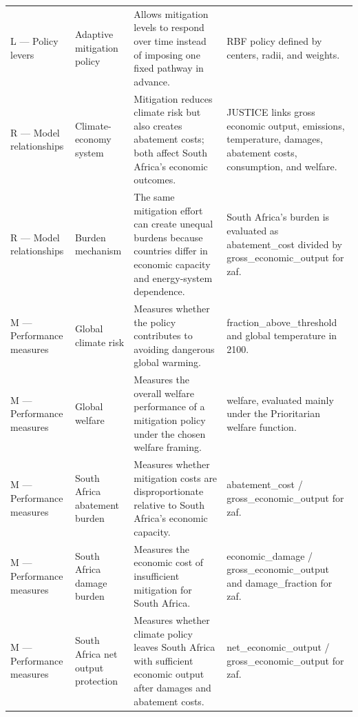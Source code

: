\begin{longtable}{p{3.2cm} p{4.0cm} p{6.0cm} p{6.0cm}}
L — Policy levers & Adaptive mitigation policy & Allows mitigation levels to respond over time instead of imposing one fixed pathway in advance. & RBF policy defined by centers, radii, and weights. \\
R — Model relationships & Climate-economy system & Mitigation reduces climate risk but also creates abatement costs; both affect South Africa's economic outcomes. & JUSTICE links gross economic output, emissions, temperature, damages, abatement costs, consumption, and welfare. \\
R — Model relationships & Burden mechanism & The same mitigation effort can create unequal burdens because countries differ in economic capacity and energy-system dependence. & South Africa's burden is evaluated as abatement\_cost divided by gross\_economic\_output for zaf. \\
M — Performance measures & Global climate risk & Measures whether the policy contributes to avoiding dangerous global warming. & fraction\_above\_threshold and global temperature in 2100. \\
M — Performance measures & Global welfare & Measures the overall welfare performance of a mitigation policy under the chosen welfare framing. & welfare, evaluated mainly under the Prioritarian welfare function. \\
M — Performance measures & South Africa abatement burden & Measures whether mitigation costs are disproportionate relative to South Africa's economic capacity. & abatement\_cost / gross\_economic\_output for zaf. \\
M — Performance measures & South Africa damage burden & Measures the economic cost of insufficient mitigation for South Africa. & economic\_damage / gross\_economic\_output and damage\_fraction for zaf. \\
M — Performance measures & South Africa net output protection & Measures whether climate policy leaves South Africa with sufficient economic output after damages and abatement costs. & net\_economic\_output / gross\_economic\_output for zaf. \\
\end{longtable}
